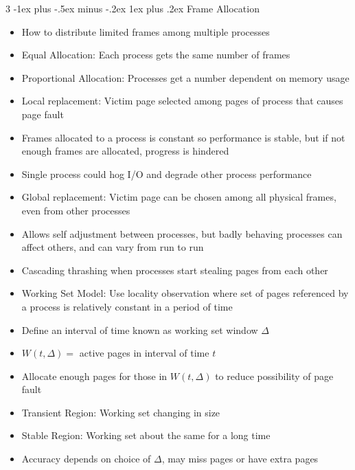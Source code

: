 \documentclass[10pt, landscape]{article}
\makeatletter
\renewcommand{\subsection}{\@startsection{subsection}{3}{0mm}%
                                {-1ex plus -.5ex minus -.2ex}%
                                {1ex plus .2ex}%
                                {\normalfont\small\bfseries}}%
\makeatother
\begin{document}
\begin{multicols*}{3}
\subsection{Frame Allocation}
\begin{itemize}
    \item How to distribute limited frames among multiple processes
    \item Equal Allocation: Each process gets the same number of frames
    \item Proportional Allocation: Processes get a number dependent on memory usage
    \item Local replacement: Victim page selected among pages of process that causes page fault
    \item Frames allocated to a process is constant so performance is stable, but if not enough frames are allocated, progress is hindered
    \item Single process could hog I/O and degrade other process performance
    \item Global replacement: Victim page can be chosen among all physical frames, even from other processes
    \item Allows self adjustment between processes, but badly behaving processes can affect others, and can vary from run to run
    \item Cascading thrashing when processes start stealing pages from each other
    \item Working Set Model: Use locality observation where set of pages referenced by a process is relatively constant in a period of time
    \item Define an interval of time known as working set window $\Delta$
    \item $W(t, \Delta)=$ active pages in interval of time $t$
    \item Allocate enough pages for those in $W(t, \Delta)$ to reduce possibility of page fault
    \item Transient Region: Working set changing in size
    \item Stable Region: Working set about the same for a long time
    \item Accuracy depends on choice of $\Delta$, may miss pages or have extra pages
\end{itemize}


\end{multicols*}
\end{document}
